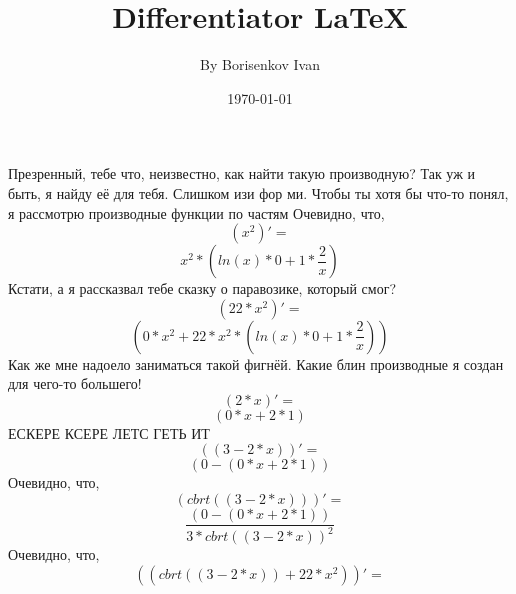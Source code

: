 \documentclass[a4paper,12pt]{article}
\author{By Borisenkov Ivan}
\title{Differentiator \LaTeX{}}
\date{\today}
\begin{document}
\maketitle
\newpage
Презренный, тебе что, неизвестно, как найти такую производную?
Так уж и быть, я найду её для тебя. Слишком изи фор ми.
Чтобы ты хотя бы что-то понял, я рассмотрю производные функции по частям
Очевидно, что,
\begin{equation}
\left( {x }^ {2 }\right)' =
\end{equation}
\begin{equation}
{{x }^ {2 }}* {\left( {{ln \left( {x }\right) }* {0 }}+ {{1 }* {\frac{{2 }}{{x }}}}\right) }
\end{equation}
Кстати, а я рассказвал тебе сказку о паравозике, который смог?
\begin{equation}
\left( {22 }* {{x }^ {2 }}\right)' =
\end{equation}
\begin{equation}
\left( {{0 }* {{x }^ {2 }}}+ {{22 }* {{{x }^ {2 }}* {\left( {{ln \left( {x }\right) }* {0 }}+ {{1 }* {\frac{{2 }}{{x }}}}\right) }}}\right) 
\end{equation}
Как же мне надоело заниматься такой фигнёй. Какие блин производные я создан для чего-то большего!
\begin{equation}
\left( {2 }* {x }\right)' =
\end{equation}
\begin{equation}
\left( {{0 }* {x }}+ {{2 }* {1 }}\right) 
\end{equation}
ЕСКЕРЕ КСЕРЕ ЛЕТС ГЕТЬ ИТ
\begin{equation}
\left( \left( {3 }- {{2 }* {x }}\right) \right)' =
\end{equation}
\begin{equation}
\left( {0 }- {\left( {{0 }* {x }}+ {{2 }* {1 }}\right) }\right) 
\end{equation}
Очевидно, что,
\begin{equation}
\left( cbrt \left( {\left( {3 }- {{2 }* {x }}\right) }\right) \right)' =
\end{equation}
\begin{equation}
\frac{{\left( {0 }- {\left( {{0 }* {x }}+ {{2 }* {1 }}\right) }\right) }}{{{3 }* {{cbrt \left( {\left( {3 }- {{2 }* {x }}\right) }\right) }^ {2 }}}}
\end{equation}
Очевидно, что,
\begin{equation}
\left( \left( {cbrt \left( {\left( {3 }- {{2 }* {x }}\right) }\right) }+ {{22 }* {{x }^ {2 }}}\right) \right)' =
\end{equation}
\end{document}
